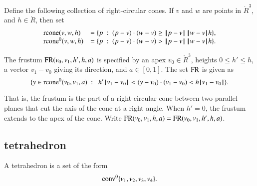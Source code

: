 \begin{definition}[rcone]
Define the following collection of right-circular cones.
If $v$ and $w$ are points in $\ring{R}^3$, and
  $h\in\ring{R}$, then set
  $$\begin{array}{lll}
    {\operatorname{rcone}}(v,w,h) &= \{p\ :\  (p-v)\cdot (w-v) \ge {\hskip0.1em|\hskip-0.15em|\hskip0.1em}p - v{\hskip0.1em|\hskip-0.15em|\hskip0.1em}\,{\hskip0.1em|\hskip-0.15em|\hskip0.1em}w - v{\hskip0.1em|\hskip-0.15em|\hskip0.1em} h\},\\
    {\operatorname{rcone}}^0(v,w,h) &= \{p\ :\  (p-v)\cdot (w-v) > {\hskip0.1em|\hskip-0.15em|\hskip0.1em}p - v{\hskip0.1em|\hskip-0.15em|\hskip0.1em}\,{\hskip0.1em|\hskip-0.15em|\hskip0.1em}w - v{\hskip0.1em|\hskip-0.15em|\hskip0.1em} h\}.\\
    \end{array}
    $$
\end{definition}



\begin{definition}[frustum, FR] The frustum
${\operatorname{FR}}(v_0,v_1,h',h,a)$ is specified by an apex $v_0\in\ring{R}^3$, heights
$0\le h'\le h$, a vector $v_1-v_0$ giving its direction, and
$a\in[0,1]$. The set ${\operatorname{FR}}$ is given as
    $$
    \{ y \in\op{rcone}^0(v_0,v_1,a) \mid \ 
       h'\norm{v_1}{v_0} < (y-v_0) \cdot (v_1-v_0) < h\norm{v_1}{v_0} \}.
    $$
\end{definition}

That is, the frustum is the part of a right-circular cone between two
parallel planes that cut the axis of the cone at a right angle.
When $h'=0$, the frustum extends to the apex of the cone.
Write ${\operatorname{FR}}(v_0,v_1,h,a)={\operatorname{FR}}(v_0,v_1,h',h,a)$.

\subsection{tetrahedron}

\begin{definition}[tetrahedron] A tetrahedron is a set of the form
$${\operatorname{conv}}^0\{v_1,v_2,v_3,v_4\}.$$
\end{definition}


